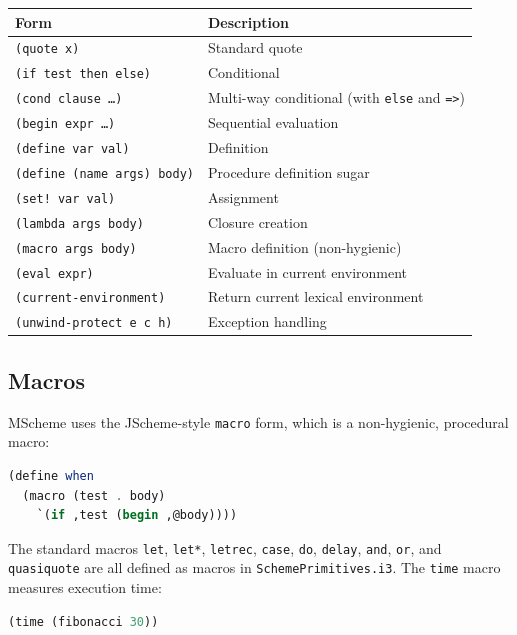 \documentclass[12pt]{report}
\begin{document}
\begin{center}
\begin{tabular}{ll}
\toprule
\textbf{Form} & \textbf{Description} \\
\midrule
{\tt (quote x)}                  & Standard quote \\
{\tt (if test then else)}        & Conditional \\
{\tt (cond clause \ldots)}       & Multi-way conditional (with {\tt else} and {\tt =>}) \\
{\tt (begin expr \ldots)}        & Sequential evaluation \\
{\tt (define var val)}           & Definition \\
{\tt (define (name args) body)}  & Procedure definition sugar \\
{\tt (set! var val)}             & Assignment \\
{\tt (lambda args body)}         & Closure creation \\
{\tt (macro args body)}          & Macro definition (non-hygienic) \\
{\tt (eval expr)}                & Evaluate in current environment \\
{\tt (current-environment)}      & Return current lexical environment \\
{\tt (unwind-protect e c h)}     & Exception handling \\
\bottomrule
\end{tabular}
\end{center}

\subsection{Macros}

MScheme uses the JScheme-style {\tt macro} form, which is a
non-hygienic, procedural macro:

\begin{lstlisting}[language=Scheme]
(define when
  (macro (test . body)
    `(if ,test (begin ,@body))))
\end{lstlisting}

The standard macros {\tt let}, {\tt let*}, {\tt letrec}, {\tt case},
{\tt do}, {\tt delay}, {\tt and}, {\tt or}, and {\tt quasiquote} are
all defined as macros in {\tt SchemePrimitives.i3}.  The {\tt time}
macro measures execution time:

\begin{lstlisting}[language=Scheme]
(time (fibonacci 30))
\end{lstlisting}
\end{document}
